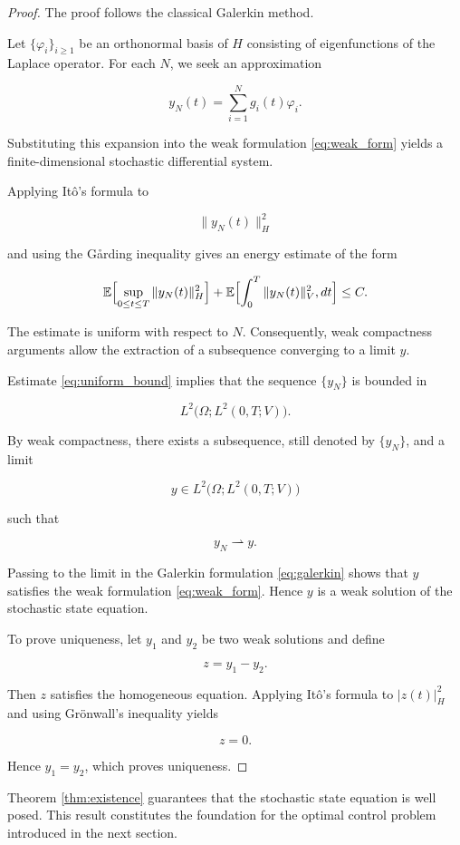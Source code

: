 \begin{proof}
The proof follows the classical Galerkin method.

Let \(\{\varphi_i\}_{i\ge1}\) be an orthonormal basis of \(H\) consisting of eigenfunctions of the 
Laplace operator. For each \(N\), we seek an approximation

\[
y_N(t)
=
\sum_{i=1}^{N}
g_i(t)\varphi_i.
\]

Substituting this expansion into the weak formulation \eqref{eq:weak_form} yields a 
finite-dimensional stochastic differential system.

Applying It\^o's formula to

\[
\|y_N(t)\|_H^2
\]

and using the G{\aa}rding inequality gives an energy estimate of the form

\[
\mathbb{E}
\Bigl[
\sup_{0\le t\le T}
\|y_N(t)\|_H^2
\Bigr]
+
\mathbb{E}
\Bigl[
\int_0^T
\|y_N(t)\|_V^2,dt
\Bigr]
\le C.
\]

The estimate is uniform with respect to \(N\). Consequently, weak compactness arguments 
allow the extraction of a subsequence converging to a limit \(y\).

Estimate \eqref{eq:uniform_bound} implies that the sequence \(\{y_N\}\) is bounded in

\[
L^2
\bigl(
\Omega;
L^2(0,T;V)
\bigr).
\]

By weak compactness, there exists a subsequence, still denoted by \(\{y_N\}\), and a limit

\[
y
\in
L^2
\bigl(
\Omega;
L^2(0,T;V)
\bigr)
\]

such that

\[
y_N
\rightharpoonup
y.
\]

Passing to the limit in the Galerkin formulation \eqref{eq:galerkin} shows that \(y\) 
satisfies the weak formulation \eqref{eq:weak_form}. Hence \(y\) is a weak solution of the 
stochastic state equation.

To prove uniqueness, let \(y_1\) and \(y_2\) be two weak solutions and define

\[
z=y_1-y_2.
\]

Then \(z\) satisfies the homogeneous equation. Applying It\^o's formula to \(|z(t)|_H^2\) 
and using Grönwall's inequality yields

\[
z=0.
\]

Hence \(y_1=y_2\), which proves uniqueness.
\end{proof}

Theorem \ref{thm:existence} guarantees that the stochastic state equation is well posed. This 
result constitutes the foundation for the optimal control problem introduced in the next section.
